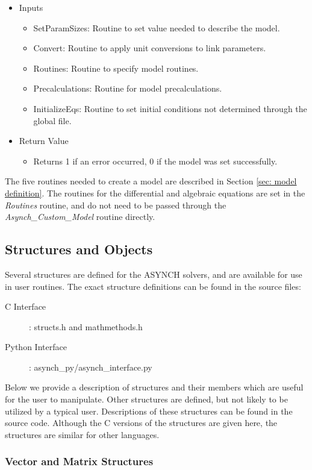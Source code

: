 \documentclass[12pt]{article}
\begin{document}
\begin{itemize}
 \item Inputs
  \begin{itemize}
   \item SetParamSizes: Routine to set value needed to describe the model.
   \item Convert: Routine to apply unit conversions to link parameters.
   \item Routines: Routine to specify model routines.
   \item Precalculations: Routine for model precalculations.
   \item InitializeEqs: Routine to set initial conditions not determined through the global file.
  \end{itemize}
 \item Return Value
  \begin{itemize}
   \item Returns 1 if an error occurred, 0 if the model was set successfully.
  \end{itemize}
\end{itemize}
The five routines needed to create a model are described in Section \ref{sec: model definition}. The routines for the differential and algebraic equations are set in the \emph{Routines} routine, and do not need to be passed through the \emph{Asynch\_Custom\_Model} routine directly.

\subsection{Structures and Objects} \label{sec: structures and objects}

Several structures are defined for the ASYNCH solvers, and are available for use in user routines. The exact structure definitions can be found in the source files:
\begin{description}
 \item[C Interface]: structs.h and mathmethods.h
 \item[Python Interface]: asynch\_py/asynch\_interface.py
\end{description}
Below we provide a description of structures and their members which are useful for the user to manipulate. Other structures are defined, but not likely to be utilized by a typical user. Descriptions of these structures can be found in the source code. Although the C versions of the structures are given here, the structures are similar for other languages.

\subsubsection{Vector and Matrix Structures} \label{sec: vector and matrix structures}
\end{document}
